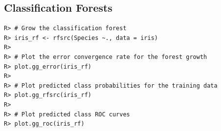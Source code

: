 \documentclass[nojss,letterpaper]{jss}\usepackage[]{graphicx}\usepackage[]{color}
\makeatletter
\newenvironment{kframe}{%
 \def\at@end@of@kframe{}%
 \ifinner\ifhmode%
  \def\at@end@of@kframe{\end{minipage}}%
  \begin{minipage}{\columnwidth}%
 \fi\fi%
 \def\FrameCommand##1{\hskip\@totalleftmargin \hskip-\fboxsep
 \colorbox{shadecolor}{##1}\hskip-\fboxsep
     \hskip-\linewidth \hskip-\@totalleftmargin \hskip\columnwidth}%
 \MakeFramed {\advance\hsize-\width
   \@totalleftmargin\z@ \linewidth\hsize
   \@setminipage}}%
 {\par\unskip\endMakeFramed%
 \at@end@of@kframe}
\newenvironment{knitrout}{}{} %
\makeatother
\begin{document}
\subsection{Classification Forests}
\begin{knitrout}\footnotesize
{}\color{fgcolor}\begin{kframe}
\begin{verbatim}
R> # Grow the classification forest
R> iris_rf <- rfsrc(Species ~., data = iris)
R> 
R> # Plot the error convergence rate for the forest growth
R> plot.gg_error(iris_rf)
R> 
R> # Plot predicted class probabilities for the training data
R> plot.gg_rfsrc(iris_rf)
R> 
R> # Plot predicted class ROC curves
R> plot.gg_roc(iris_rf)
\end{verbatim}
\end{kframe}
\end{knitrout}

\end{document}
